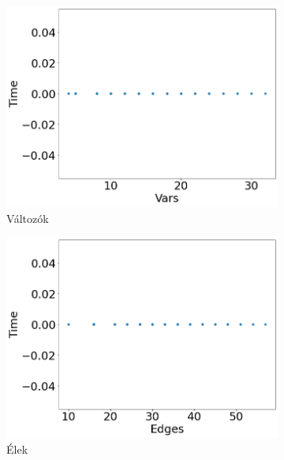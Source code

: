 \begin{figure}[ht] 
	\begin{subfigure}[b]{0.5\linewidth}
		\centering
		\includegraphics[width=0.95\linewidth]{figures/locks/vars.png} 
		\caption{Változók} 
		\vspace{4ex}
	\end{subfigure}%
	\begin{subfigure}[b]{0.5\linewidth}
		\centering
		\includegraphics[width=0.95\linewidth]{figures/locks/edges.png} 
		\caption{Élek} 
		\vspace{4ex}
	\end{subfigure} 
	\begin{subfigure}[b]{0.5\linewidth}
		\centering

\end{subfigure}
\end{figure}
